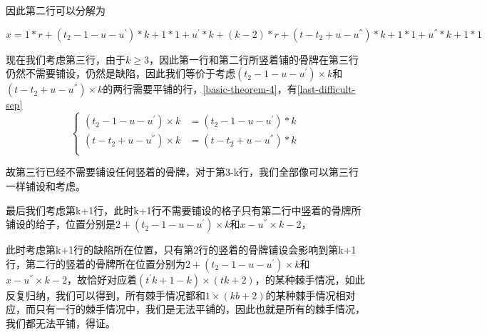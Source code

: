 因此第二行可以分解为

$x =  1 * r +  (t_2- 1 - u - u^{'}) * k + 1* 1 +  u^{'} * k  + (k - 2) * r + (t - t_2 + u - u^{''}) * k + 1 * 1 +  u^{''} * k + 1 * 1$

现在我们考虑第三行，由于$k \ge 3$，因此第一行和第二行所竖着铺的骨牌在第三行仍然不需要铺设，仍然是缺陷，因此我们等价于考虑$(t_2- 1 - u - u^{'}) \times k$和$(t - t_2 + u - u^{''}) \times k$的两行需要平铺的行，\ref*{basic-theorem-4}，有\ref*{last-difficult-sep}
$$
    \left\{
    \begin{aligned}
        (t_2- 1 - u - u^{'}) \times k & = (t_2- 1 - u - u^{'}) * k    \\
        (t - t_2 + u - u^{''}) \times k & = (t - t_2 + u - u^{''}) * k\\
        \label{last-difficult-sep}
    \end{aligned}
    \right.
$$

故第三行已经不需要铺设任何竖着的骨牌，对于第3-k行，我们全部像可以第三行一样铺设和考虑。

最后我们考虑第k+1行，此时k+1行不需要铺设的格子只有第二行中竖着的骨牌所铺设的给子，位置分别是$2 + (t_2- 1 - u - u^{'}) \times k$和$x - u^{''} \times k - 2$，

此时考虑第k+1行的缺陷所在位置，只有第2行的竖着的骨牌铺设会影响到第k+1行，第二行的竖着的骨牌所在位置分别为$2 + (t_2- 1 - u - u^{'}) \times k$和$x - u^{''} \times k - 2$，故恰好对应着$(t^{'}k + 1 -k) \times (tk + 2)$，的某种棘手情况，如此反复归纳，我们可以得到，所有棘手情况都和$1 \times (kb + 2)$的某种棘手情况相对应，而只有一行的棘手情况中，我们是无法平铺的，因此也就是所有的棘手情况，我们都无法平铺，得证。\cite{liu2011sift}

\clearpage